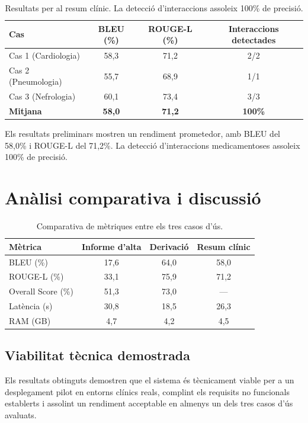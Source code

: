 \documentclass[CAT]{TFUOC}%
\begin{document}
\begin{table}[H]
\centering
\small
\begin{tabular}{lccc}
\hline
\textbf{Cas} & \textbf{BLEU (\%)} & \textbf{ROUGE-L (\%)} & \textbf{Interaccions detectades} \\
\hline
Cas 1 (Cardiologia) & 58,3 & 71,2 & 2/2 \\
Cas 2 (Pneumologia) & 55,7 & 68,9 & 1/1 \\
Cas 3 (Nefrologia) & 60,1 & 73,4 & 3/3 \\
\hline
\textbf{Mitjana} & \textbf{58,0} & \textbf{71,2} & \textbf{100\%} \\
\hline
\end{tabular}
\caption{Resultats per al resum clínic. La detecció d'interaccions assoleix 100\% de precisió.}
\label{tab:summary-results}
\end{table}

Els resultats preliminars mostren un rendiment prometedor, amb BLEU del 58,0\% i ROUGE-L del 71,2\%. La detecció d'interaccions medicamentoses assoleix 100\% de precisió.

\section{Anàlisi comparativa i discussió}

\begin{table}[H]
\centering
\small
\begin{tabular}{lccc}
\hline
\textbf{Mètrica} & \textbf{Informe d'alta} & \textbf{Derivació} & \textbf{Resum clínic} \\
\hline
BLEU (\%) & 17,6 & 64,0 & 58,0 \\
ROUGE-L (\%) & 33,1 & 75,9 & 71,2 \\
Overall Score (\%) & 51,3 & 73,0 & --- \\
Latència (s) & 30,8 & 18,5 & 26,3 \\
RAM (GB) & 4,7 & 4,2 & 4,5 \\
\hline
\end{tabular}
\caption{Comparativa de mètriques entre els tres casos d'ús.}
\label{tab:comparative}
\end{table}

\subsection{Viabilitat tècnica demostrada}

Els resultats obtinguts demostren que el sistema és tècnicament viable per a un desplegament pilot en entorns clínics reals, complint els requisits no funcionals establerts i assolint un rendiment acceptable en almenys un dels tres casos d'ús avaluats.
\end{document}
